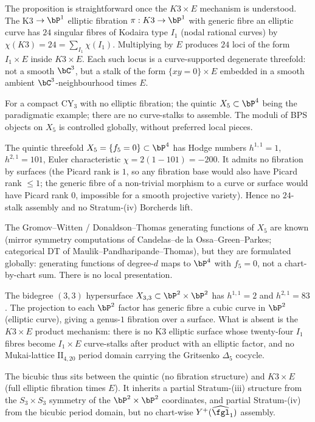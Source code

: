 The proposition is straightforward once the $K3 \times E$ mechanism is
understood. The K3 $\to \bP^1$ elliptic fibration
$\pi: K3 \to \bP^1$ with generic fibre an elliptic curve has $24$
singular fibres of Kodaira type $I_1$ (nodal rational curves) by
$\chi(K3) = 24 = \sum_{I_1} \chi(I_1)$. Multiplying by $E$ produces
$24$ loci of the form $I_1 \times E$ inside $K3 \times E$. Each such
locus is a curve-supported degenerate threefold: not a smooth $\bC^3$,
but a stalk of the form $\{xy = 0\} \times E$ embedded in a smooth
ambient $\bC^3$-neighbourhood times $E$.

For a compact CY$_3$ with no elliptic fibration; the quintic $X_5
\subset \bP^4$ being the paradigmatic example; there are no
curve-stalks to assemble. The moduli of BPS objects on $X_5$ is controlled
globally, without preferred local pieces.

\begin{example}
\label{ex:quintic}
The quintic threefold $X_5 = \{f_5 = 0\} \subset \bP^4$ has Hodge numbers
$h^{1,1} = 1$, $h^{2,1} = 101$, Euler characteristic $\chi = 2(1 - 101)
= -200$. It admits no fibration by surfaces (the Picard rank is $1$, so
any fibration base would also have Picard rank $\leq 1$; the generic
fibre of a non-trivial morphism to a curve or surface would have Picard
rank $0$, impossible for a smooth projective variety). Hence no
$24$-stalk assembly and no Stratum-(iv) Borcherds lift.

The Gromov--Witten / Donaldson--Thomas generating functions of $X_5$
are known (mirror symmetry computations of Candelas--de la Ossa--Green--Parkes;
categorical DT of Maulik--Pandharipande--Thomas), but they are
formulated globally: generating functions of degree-$d$ maps to $\bP^4$
with $f_5 = 0$, not a chart-by-chart sum. There is no local presentation.
\end{example}

\begin{example}
\label{ex:bicubic}
The bidegree $(3,3)$ hypersurface $X_{3,3} \subset \bP^2 \times \bP^2$
has $h^{1,1} = 2$ and $h^{2,1} = 83$. The projection to each $\bP^2$
factor has generic fibre a cubic curve in $\bP^2$ (elliptic curve),
giving a genus-$1$ fibration over a surface. What is absent is the
$K3\times E$ product mechanism: there is no K3 elliptic surface whose
twenty-four $I_1$ fibres become $I_1\times E$ curve-stalks after
product with an elliptic factor, and no Mukai-lattice
$\mathrm{II}_{4,20}$ period domain carrying the Gritsenko
$\Delta_5$ cocycle.

The bicubic thus sits between the quintic (no fibration structure) and
$K3 \times E$ (full elliptic fibration times $E$). It inherits a
partial Stratum-(iii) structure from the $S_3 \times S_3$ symmetry of
the $\bP^2 \times \bP^2$ coordinates, and partial Stratum-(iv) from
the bicubic period domain, but no chart-wise $Y^+(\widehat{\fgl}_1)$
assembly.
\end{example}

